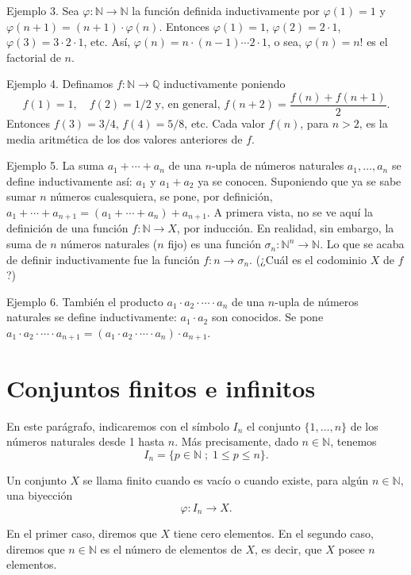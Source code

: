 \documentclass[12pt,oneside]{book}
\begin{document}
Ejemplo 3. Sea \(\varphi: \mathbb{N} \to \mathbb{N}\) la función definida inductivamente por \(\varphi(1) = 1\) y \(\varphi(n+1) = (n+1) \cdot \varphi(n)\). Entonces \(\varphi(1) = 1\), \(\varphi(2) = 2 \cdot 1\), \(\varphi(3) = 3 \cdot 2 \cdot 1\), etc. Así, \(\varphi(n) = n \cdot (n-1) \cdots 2 \cdot 1\), o sea, \(\varphi(n) = n!\) es el factorial de \(n\).

Ejemplo 4. Definamos \(f: \mathbb{N} \to \mathbb{Q}\) inductivamente poniendo
\[
f(1) = 1,\quad f(2) = 1/2 \text{ y, en general, } f(n+2) = \frac{f(n) + f(n+1)}{2}.
\]
Entonces \(f(3) = 3/4\), \(f(4) = 5/8\), etc. Cada valor \(f(n)\), para \(n > 2\), es la media aritmética de los dos valores anteriores de \(f\).

Ejemplo 5. La suma \(a_1 + \cdots + a_n\) de una \(n\)-upla de números naturales \(a_1, \ldots, a_n\) se define inductivamente así: \(a_1\) y \(a_1 + a_2\) ya se conocen. Suponiendo que ya se sabe sumar \(n\) números cualesquiera, se pone, por definición, \(a_1 + \cdots + a_{n+1} = (a_1 + \cdots + a_n) + a_{n+1}\). A primera vista, no se ve aquí la definición de una función \(f: \mathbb{N} \to X\), por inducción. En realidad, sin embargo, la suma de \(n\) números naturales (\(n\) fijo) es una función \(\sigma_n: \mathbb{N}^n \to \mathbb{N}\). Lo que se acaba de definir inductivamente fue la función \(f: n \to \sigma_n\). (¿Cuál es el codominio \(X\) de \(f\)?)

Ejemplo 6. También el producto \(a_1 \cdot a_2 \cdot \cdots \cdot a_n\) de una \(n\)-upla de números naturales se define inductivamente: \(a_1 \cdot a_2\) son conocidos. Se pone \(a_1 \cdot a_2 \cdot \cdots \cdot a_{n+1} = (a_1 \cdot a_2 \cdot \cdots \cdot a_n) \cdot a_{n+1}\).

\section{Conjuntos finitos e infinitos}

En este parágrafo, indicaremos con el símbolo \(I_n\) el conjunto \(\{1, \ldots, n\}\) de los números naturales desde 1 hasta \(n\). Más precisamente, dado \(n \in \mathbb{N}\), tenemos
\[
I_n = \{p \in \mathbb{N} \; ; \; 1 \leq p \leq n\}.
\]

Un conjunto \(X\) se llama finito cuando es vacío o cuando existe, para algún \(n \in \mathbb{N}\), una biyección
\[
\varphi: I_n \to X.
\]

En el primer caso, diremos que \(X\) tiene cero elementos. En el segundo caso, diremos que \(n \in \mathbb{N}\) es el número de elementos de \(X\), es decir, que \(X\) posee \(n\) elementos.
\end{document}

